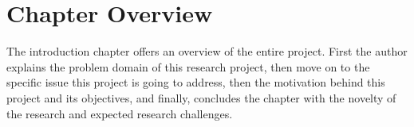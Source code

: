 \section{Chapter Overview}

The introduction chapter offers an overview of the entire project. First the author explains the problem domain of this research project, then move on to the specific issue this project is going to address, then the motivation behind this project and its objectives, and finally, concludes the chapter with the novelty of the research and expected research challenges.